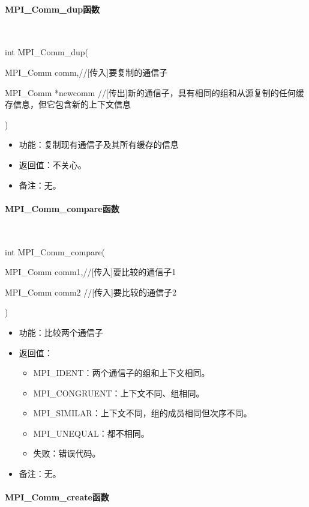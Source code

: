 \documentclass[UTF8]{article}%
\begin{document}
\paragraph{MPI\_Comm\_dup函数}~{}

int MPI\_Comm\_dup(
    
    \qquad MPI\_Comm comm,//[传入]要复制的通信子

    \qquad MPI\_Comm *newcomm //[传出]新的通信子，具有相同的组和从源复制的任何缓存信息，但它包含新的上下文信息
    
    )

\begin{itemize}
    \item 功能：复制现有通信子及其所有缓存的信息
    \item 返回值：不关心。
    \item 备注：无。
\end{itemize}

\paragraph{MPI\_Comm\_compare函数}~{}

int MPI\_Comm\_compare(
    
    \qquad MPI\_Comm comm1,//[传入]要比较的通信子1

    \qquad MPI\_Comm comm2 //[传入]要比较的通信子2
    
    )

\begin{itemize}
    \item 功能：比较两个通信子
    \item 返回值：
    
    {
        \begin{itemize}
            \item MPI\_IDENT：两个通信子的组和上下文相同。
            \item MPI\_CONGRUENT：上下文不同、组相同。
            \item MPI\_SIMILAR：上下文不同，组的成员相同但次序不同。
            \item MPI\_UNEQUAL：都不相同。
            \item 失败：错误代码。    
        \end{itemize}
    }
    \item 备注：无。
\end{itemize}


\paragraph{MPI\_Comm\_create函数}~{}
\end{document}

